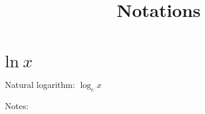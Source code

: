 \documentclass{article}
\title{Notations}
\date{}
\author{}
\begin{document}
\maketitle

\section*{$\text{ln}~x$}
Natural logarithm: $\log_ex$

Notes:
\end{document}

